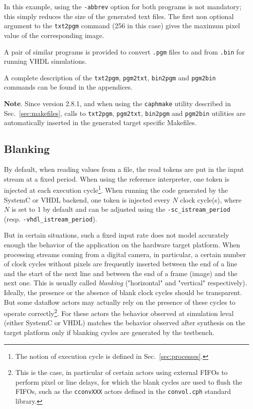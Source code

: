 In this example, using the \verb|-abbrev| option for both programs is not mandatory; this simply reduces the size of
the generated text files. The first non optional argument to the \verb|txt2pgm| command (256 in this
case) gives the maximum pixel value of the corresponding image. 

A pair of similar programs is provided to convert \verb|.pgm| files to and from \verb|.bin| for
running VHDL simulations.

A complete description of the \verb|txt2pgm|, \verb|pgm2txt|, \verb|bin2pgm| and \verb|pgm2bin| commands can be found in
the appendices. 

\medskip \textbf{Note}. Since version 2.8.1, and when using the \verb|caphmake| utility described in
Sec.~\ref{sec:makefiles}, calls to \verb|txt2pgm|, \verb|pgm2txt|, \verb|bin2pgm| and \verb|pgm2bin|
utilities are automatically
inserted in the generated target specific Makefiles.

\subsection{Blanking}
\label{sec:blanking}

By default, when reading values from a file, the read tokens are put in the input stream at a fixed
period. When using the reference interpreter, one token is injected at each execution
cycle\footnote{The notion of execution cycle is defined in Sec.~\ref{sec:processes}.}. When running
the code generated by the SystemC or VHDL backend, one token is injected every $N$ clock cycle(s),
where $N$ is set to 1 by default and can be adjusted using the \verb|-sc_istream_period|
(resp. \verb|-vhdl_istream_period|).

But in certain situations, such a fixed input rate does not model accurately enough the behavior of
the application on the hardware target platform. When processing streams coming from a digital
camera, in particular, a certain number of clock cycles without pixels are frequently inserted
between the end of a line and the start of the next line and between the end of a frame (image) and
the next one. This is usually called \emph{blanking} ("horizontal" and "vertical" respectively).
Ideally, the presence or the absence of blank clock cycles should be transparent. But some dataflow
actors may actually rely on the presence of these cycles to operate correctly\footnote{This is the
  case, in particular of certain actors using external FIFOs to perform pixel or line delays, for
  which the blank cycles are used to flush the FIFOs, such as the \texttt{cconvXXX} actors defined
  in the \texttt{convol.cph} standard library.}. For these actors the behavior observed at
simulation leval (either SystemC or VHDL) matches the behavior observed after synthesis on the
target platform only if blanking cycles are generated by the testbench.

